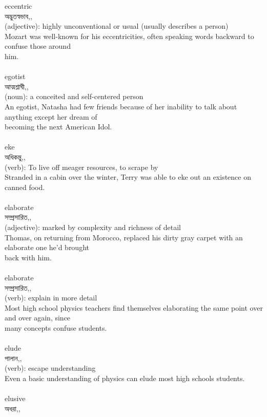 \documentclass{article}
\begin{document}
{eccentric}\\
{অদ্ভুতস্বভাব,,}\\
{(adjective): highly unconventional or usual (usually describes a person)\\Mozart was well-known for his eccentricities, often speaking words backward to confuse those around\\him.\\}\\
{egotist}\\
{আত্মশ্লাঘী,,}\\
{(noun): a conceited and self-centered person\\An egotist, Natasha had few friends because of her inability to talk about anything except her dream of\\becoming the next American Idol.\\}\\
{eke}\\
{অধিকন্তু,,}\\
{(verb): To live off meager resources, to scrape by\\Stranded in a cabin over the winter, Terry was able to eke out an existence on canned food.\\}\\
{elaborate}\\
{সম্প্রসারিত,,}\\
{(adjective): marked by complexity and richness of detail\\Thomas, on returning from Morocco, replaced his dirty gray carpet with an elaborate one he'd brought\\back with him.\\}\\
{elaborate}\\
{সম্প্রসারিত,,}\\
{(verb): explain in more detail\\Most high school physics teachers find themselves elaborating the same point over and over again, since\\many concepts confuse students.\\}\\
{elude}\\
{পালান,,}\\
{(verb): escape understanding\\Even a basic understanding of physics can elude most high schools students.\\}\\
{elusive}\\
{অধরা,,}\\
\end{document}
